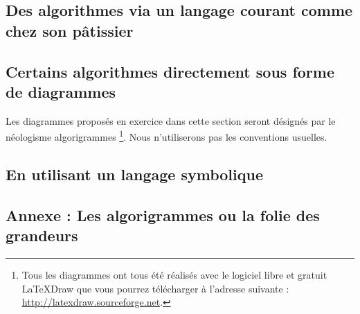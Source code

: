 \subsection{Des algorithmes via un langage courant comme chez son pâtissier}
    


\subsection{Certains algorithmes directement sous forme de diagrammes}

    Les diagrammes proposés en exercice dans cette section seront désignés par le néologisme \og algorigrammes \fg{}
    \footnote{
        Tous les diagrammes ont tous été réalisés avec le logiciel libre et gratuit
        LaTeXDraw que vous pourrez télécharger à l'adresse suivante :
        \url{http://latexdraw.sourceforge.net}.
    }. Nous n'utiliserons pas les conventions usuelles.

    


\subsection{En utilisant un langage symbolique}
    


\newpage

\subsection*{Annexe : Les algorigrammes ou la folie des grandeurs}
    
